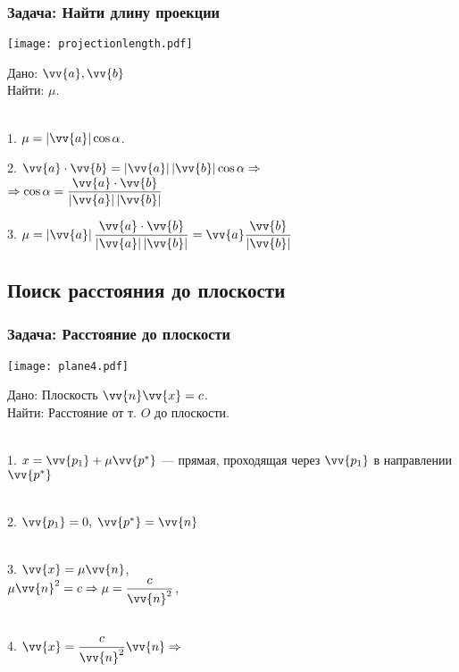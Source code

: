 \documentclass[10pt]{beamer}
\begin{document}
\begin{frame}\frametitle {Задача: Найти длину проекции}
{
	{

		\texttt{[image: projectionlength.pdf]}
	}
	{
		Дано: $\vv{a}, \vv{b}$ \\
		Найти: $\mu$. \\ ~ \\
		
		\pause
		
		1. $\mu = |\vv{a}|\cos\alpha$.
		
		\pause
		
		2. $\vv{a}\cdot\vv{b} = \ABS{\vv{a}}\ABS{\vv{b}}\cos \alpha \Rightarrow $ \\
		$ \Rightarrow \cos \alpha = \displaystyle\frac{\vv{a}\cdot\vv{b}}{\ABS{\vv{a}}\ABS{\vv{b}}} $
		
		\pause
		
		3. $\displaystyle \mu=\ABS{ \vv{a} } \frac{\vv{a}\cdot\vv{b}}{\ABS{\vv{a}}\ABS{\vv{b}}} =  \vv{a} \frac{\vv{b}}{\ABS{ \vv{b} }  } $
		
			
	}
}
\end{frame}

\subsection{Поиск расстояния до плоскости}

\begin{frame}\frametitle {Задача: Расстояние до плоскости}
{
	{
		
		\texttt{[image: plane4.pdf]}
	}
	{

		Дано: Плоскость $\vv{n}\vv{x}=c$. \\
		Найти: Расстояние от т. $O$ до плоскости. \\ ~ \\
		
		\pause
		
		1. $x = \vv{p_1} + \mu\vv{p^*}$ --- прямая, проходящая через $\vv{p_1}$ в направлении $\vv{p^*}$  \\ ~ \\
		
		\pause
		
		2. $\vv{p_1} = 0, \; \vv{p^*} = \vv{n}$   \\ ~ \\
		
		\pause
		
		3. $\vv{x} = \mu\vv{n} $, \\
		 $\displaystyle\mu\vv{n}^2 = c  \Rightarrow \mu = \frac{c}{\vv{n}^2} $, \\ ~ \\
		 
		 \pause
		 
		 4. $\displaystyle\vv{x} = \frac{c}{\vv{n}^2} \vv{n} \Rightarrow $ 
		 
		
	}
}
\end{frame}
\end{document}
